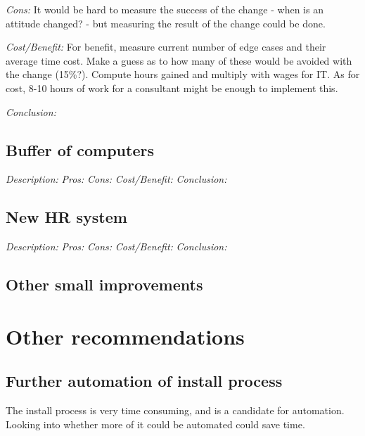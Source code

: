 \emph{Cons:} It would be hard to measure the success of the change - when is an attitude changed? - but measuring the result of the change could be done.

\emph{Cost/Benefit:} For benefit, measure current number of edge cases and their average time cost.
Make a guess as to how many of these would be avoided with the change (15\%?).
Compute hours gained and multiply with wages for IT.
As for cost, 8-10 hours of work for a consultant might be enough to implement this.

\emph{Conclusion:} 

\subsection{Buffer of computers}
\emph{Description:}
\emph{Pros:}
\emph{Cons:}
\emph{Cost/Benefit:}
\emph{Conclusion:}

\subsection{New HR system}
\emph{Description:}
\emph{Pros:}
\emph{Cons:}
\emph{Cost/Benefit:}
\emph{Conclusion:}

\subsection{Other small improvements}

\section{Other recommendations}
\subsection{Further automation of install process}
The install process is very time consuming, and is a candidate for automation.
Looking into whether more of it could be automated could save time.
